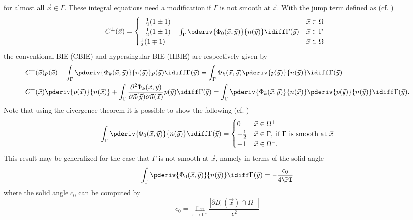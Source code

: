 for almost all $\vec{x}\in\Gamma$. These integral equations need a modification if $\Gamma$ is not smooth at $\vec{x}$. With the jump term defined as (cf. \cite{Hwang1997hbi})
\begin{equation}\label{Eq3:jumpTerm}
	C^\pm(\vec{x}) = \begin{cases}-\frac{1}{2}(1\pm 1) & \vec{x}\in\Omega^+\\-\frac{1}{2}(1\pm 1) - \int_\Gamma \pderiv{\Phi_0(\vec{x},\vec{y})}{n(\vec{y})}\idiff\Gamma(\vec{y}) &\vec{x}\in\Gamma\\
	\frac{1}{2}(1\mp 1)& \vec{x}\in\Omega^-\end{cases}
\end{equation}
the conventional BIE (CBIE) and hypersingular BIE (HBIE) are respectively given by 
\begin{align}\label{Eq3:CBIE}
	& C^\pm(\vec{x})p(\vec{x}) + \int_\Gamma \pderiv{\Phi_k(\vec{x},\vec{y})}{n(\vec{y})} p(\vec{y}) \idiff\Gamma(\vec{y}) = \int_\Gamma \Phi_k(\vec{x},\vec{y}) \pderiv{p(\vec{y})}{n(\vec{y})} \idiff\Gamma(\vec{y})\\\label{Eq3:HBIE}
	& C^\pm(\vec{x})\pderiv{p(\vec{x})}{n(\vec{x})} +  \int_\Gamma \frac{\partial^2\Phi_k(\vec{x},\vec{y})}{\partial\vec{n}(\vec{y})\partial\vec{n}(\vec{x})} p(\vec{y}) \idiff\Gamma(\vec{y}) = \int_\Gamma \pderiv{\Phi_k(\vec{x},\vec{y})}{n(\vec{x})} \pderiv{p(\vec{y})}{n(\vec{y})} \idiff\Gamma(\vec{y}).
\end{align}
Note that using the divergence theorem it is possible to show the following (cf. \cite[p. 126]{Sauter2011bem})
\begin{equation*}
	\int_\Gamma \pderiv{\Phi_0(\vec{x},\vec{y})}{n(\vec{y})}\idiff\Gamma(\vec{y})=\begin{cases}
		0 & \vec{x}\in\Omega^+\\
		-\frac{1}{2} & \vec{x}\in\Gamma,\text{ if } \Gamma \text{ is smooth at } \vec{x}\\
		-1 & \vec{x}\in\Omega^-.
	\end{cases}
\end{equation*}
This result may be generalized for the case that $\Gamma$ is not smooth at $\vec{x}$, namely in terms of the solid angle~\cite{Sun2015bri}
\begin{equation}\label{Eq3:Phi0SolidAngle}
	\int_\Gamma \pderiv{\Phi_0(\vec{x},\vec{y})}{n(\vec{y})}\idiff\Gamma(\vec{y}) = -\frac{c_0}{4\PI}
\end{equation}
where the solid angle $c_0$ can be computed by
\begin{equation*}
	c_0 = \lim_{\epsilon\to 0^+}\frac{|\partial B_\epsilon(\vec{x})\cap\Omega^-|}{\epsilon^2}
\end{equation*}

